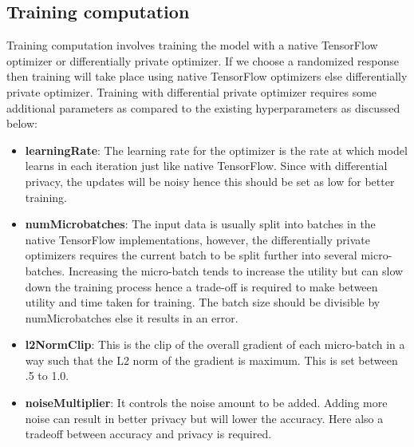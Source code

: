 \subsection{Training computation}
Training computation involves training the model with a native TensorFlow optimizer or differentially private optimizer. If we choose a randomized response then training will take place using native TensorFlow optimizers else differentially private optimizer. Training with differential private optimizer requires some additional parameters as compared to the existing hyperparameters as discussed below:
\begin{itemize}
    \item \textbf{learningRate}: The learning rate for the optimizer is the rate at which model learns in each iteration just like native TensorFlow. Since with differential privacy, the updates will be noisy hence this should be set as low for better training.
    \vspace{-0.3cm} \item \textbf{numMicrobatches}: The input data is usually split into batches in the native TensorFlow implementations, however, the differentially private optimizers requires the current batch to be split further into several micro-batches. Increasing the micro-batch tends to increase the utility but can slow down the training process hence a trade-off is required to make between utility and time taken for training. The batch size should be divisible by numMicrobatches else it results in an error.
    \vspace{-0.3cm} \item \textbf{l2NormClip}: This is the clip of the overall gradient of each micro-batch in a way such that the L2 norm of the gradient is maximum. This is set between .5 to 1.0.
    \vspace{-0.3cm} \item \textbf{noiseMultiplier}: It controls the noise amount to be added. Adding more noise can result in better privacy but will lower the accuracy. Here also a tradeoff between accuracy and privacy is required.
\end{itemize}

